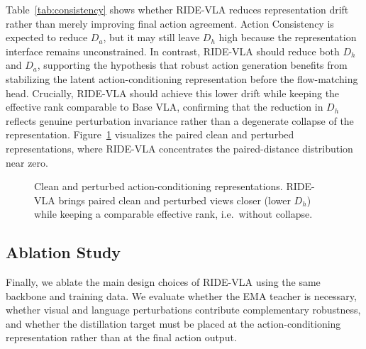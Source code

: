 \documentclass[letterpaper]{article} %
\newcommand{\method}{\textsc{RIDE-VLA}}
\begin{document}
Table~\ref{tab:consistency} shows whether \method{} reduces representation drift rather than merely improving final action agreement. Action Consistency is expected to reduce $D_a$, but it may still leave $D_h$ high because the representation interface remains unconstrained. In contrast, \method{} should reduce both $D_h$ and $D_a$, supporting the hypothesis that robust action generation benefits from stabilizing the latent action-conditioning representation before the flow-matching head. Crucially, \method{} should achieve this lower drift while keeping the effective rank comparable to Base VLA, confirming that the reduction in $D_h$ reflects genuine perturbation invariance rather than a degenerate collapse of the representation. Figure~\ref{fig:representation} visualizes the paired clean and perturbed representations, where \method{} concentrates the paired-distance distribution near zero.

\begin{figure}[t]
\centering
\caption{Clean and perturbed action-conditioning representations. \method{} brings paired clean and perturbed views closer (lower $D_h$) while keeping a comparable effective rank, i.e.\ without collapse.}
\label{fig:representation}
\end{figure}

\subsection{Ablation Study}

Finally, we ablate the main design choices of \method{} using the same backbone and training data. We evaluate whether the EMA teacher is necessary, whether visual and language perturbations contribute complementary robustness, and whether the distillation target must be placed at the action-conditioning representation rather than at the final action output.
\end{document}

